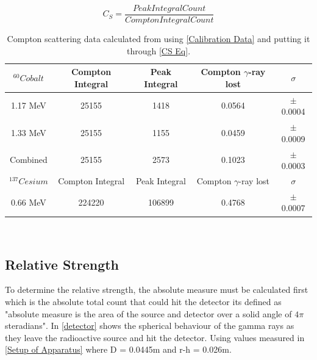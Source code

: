 \documentclass[12pt]{article}
\begin{document}
\begin{equation}
C_S = \dfrac{Peak Integral Count}{Compton Integral Count}
\label{CS Eq}
\end{equation} 

\begin{table}[H]
\begin{center}
 \footnotesize
 \begin{tabular}{|c||c|c|c|c|}
 \hline
  $^{60}Cobalt$ & Compton Integral & Peak Integral & Compton $\gamma$-ray lost & $\sigma$ \\
 \hline 
  1.17 MeV & 25155 & 1418 & 0.0564 & $\pm$0.0004 \\
 \hline
  1.33 MeV & 25155 & 1155 & 0.0459 & $\pm$0.0009 \\
  \hline
  Combined & 25155 & 2573 & 0.1023 & $\pm$0.0003 \\
 \hline \hline
  $^{137}Cesium$& Compton Integral & Peak Integral & Compton $\gamma$-ray lost & $\sigma$ \\
 \hline
 0.66 MeV & 224220 & 106899 & 0.4768 & $\pm$0.0007 \\
 \hline 
 \end{tabular} \\ 
 \caption{Compton scattering data calculated from using \cref{Calibration Data} and putting it through \cref{CS Eq}. }
 \label{ER Data}
\end{center}
\end{table}

\subsection{Relative Strength}
\label{rrelative Strength SubSection}

To determine the relative strength, the absolute measure must be calculated first which is the absolute total count that could hit the detector its defined as "absolute measure is the area of the source and detector over a solid angle of $4\pi$ steradians". In \cref{detector} shows the spherical behaviour of the gamma rays as they leave the radioactive source and hit the detector. Using values measured in \cref{Setup of Apparatus} where D = 0.0445m and r-h = 0.026m. \\
\end{document}
